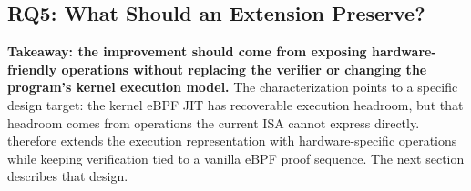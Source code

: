 \subsection{RQ5: What Should an Extension Preserve?}
\label{subsec:char-implications}

\noindent\textbf{Takeaway: the improvement should come from exposing
hardware-friendly operations without replacing the verifier or changing the
program's kernel execution model.}
The characterization points to a specific design target: the kernel eBPF JIT
has recoverable execution headroom, but that headroom comes from operations the
current ISA cannot express directly. \lang therefore extends the execution
representation with hardware-specific operations while keeping verification
tied to a vanilla eBPF proof sequence. The next section describes that design.